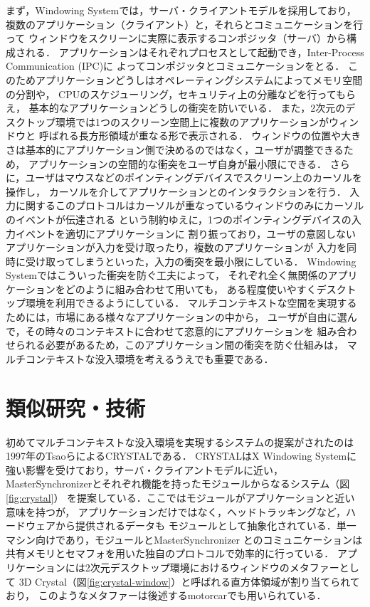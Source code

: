 まず，Windowing Systemでは，サーバ・クライアントモデルを採用しており，
複数のアプリケーション（クライアント）と，それらとコミュニケーションを行って
ウィンドウをスクリーンに実際に表示するコンポジッタ（サーバ）から構成される．
アプリケーションはそれぞれプロセスとして起動でき，Inter-Process Communication (IPC)に
よってコンポジッタとコミュニケーションをとる．
このためアプリケーションどうしはオペレーティングシステムによってメモリ空間の分割や，
CPUのスケジューリング，セキュリティ上の分離などを行ってもらえ，
基本的なアプリケーションどうしの衝突を防いでいる．
また，2次元のデスクトップ環境では1つのスクリーン空間上に複数のアプリケーションがウィンドウと
呼ばれる長方形領域が重なる形で表示される．
ウィンドウの位置や大きさは基本的にアプリケーション側で決めるのではなく，ユーザが調整できるため，
アプリケーションの空間的な衝突をユーザ自身が最小限にできる．
さらに，ユーザはマウスなどのポインティングデバイスでスクリーン上のカーソルを操作し，
カーソルを介してアプリケーションとのインタラクションを行う．
入力に関するこのプロトコルはカーソルが重なっているウィンドウのみにカーソルのイベントが伝達される
という制約ゆえに，1つのポインティングデバイスの入力イベントを適切にアプリケーションに
割り振っており，ユーザの意図しないアプリケーションが入力を受け取ったり，複数のアプリケーションが
入力を同時に受け取ってしまうといった，入力の衝突を最小限にしている．
Windowing Systemではこういった衝突を防ぐ工夫によって，
それぞれ全く無関係のアプリケーションをどのように組み合わせて用いても，
ある程度使いやすくデスクトップ環境を利用できるようにしている．
マルチコンテキストな空間を実現するためには，市場にある様々なアプリケーションの中から，
ユーザが自由に選んで，その時々のコンテキストに合わせて恣意的にアプリケーションを
組み合わせられる必要があるため，このアプリケーション間の衝突を防ぐ仕組みは，
マルチコンテキストな没入環境を考えるうえでも重要である．

\section{類似研究・技術}
\label{section:overview:related-work}

初めてマルチコンテキストな没入環境を実現するシステムの提案がされたのは
1997年のTsaoらによるCRYSTAL\cite{crystal}である．
CRYSTALはX Windowing Systemに強い影響を受けており，サーバ・クライアントモデルに近い，
MasterSynchronizerとそれぞれ機能を持ったモジュールからなるシステム（図\ref{fig:crystal}）
を提案している．ここではモジュールがアプリケーションと近い意味を持つが，
アプリケーションだけではなく，ヘッドトラッキングなど，ハードウェアから提供されるデータも
モジュールとして抽象化されている．単一マシン向けであり，モジュールとMasterSynchronizer
とのコミュニケーションは共有メモリとセマフォを用いた独自のプロトコルで効率的に行っている．
アプリケーションには2次元デスクトップ環境におけるウィンドウのメタファーとして
3D Crystal（図\ref{fig:crystal-window}）と呼ばれる直方体領域が割り当てられており，
このようなメタファーは後述するmotorcar\cite{reiling}でも用いられている．

